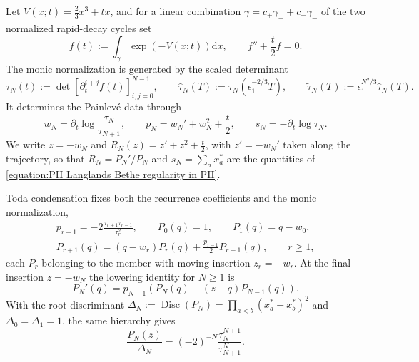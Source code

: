 \documentclass[a4paper,11pt]{article}
\newcommand{\dd}{\mathrm{d}}
\numberwithin{equation}{section}
\begin{document}
Let $V(x;t)=\frac{2}{3}x^{3}+tx$, and for a linear combination
$\gamma=c_{+}\gamma_{+}+c_{-}\gamma_{-}$ of the two normalized
rapid-decay cycles set
\begin{equation}
\label{equation:PII normalization seed}
f(t):=\int_{\gamma}\exp\left(-V(x;t)\right)\dd{x},
\qquad f''+\frac{t}{2}f=0.
\end{equation}
The monic normalization is generated by the scaled determinant
\begin{equation}
\label{equation:PII normalization tau}
\tau_{N}(t):=\det\left[\partial_{t}^{i+j}f(t)\right]_{i,j=0}^{N-1},
\qquad
\widehat{\tau}_{N}(T):=\tau_{N}\left(\epsilon_{1}^{-2/3}T\right),
\qquad
\widetilde{\tau}_{N}(T):=\epsilon_{1}^{N^{2}/3}\widehat{\tau}_{N}(T).
\end{equation}
It determines the Painlev\'e data through
\begin{equation}
\label{equation:PII normalization hierarchy}
w_{N}=\partial_{t}\log{\frac{\tau_{N}}{\tau_{N+1}}},
\qquad
p_{N}=w_{N}'+w_{N}^{2}+\frac{t}{2},
\qquad
s_{N}=-\partial_{t}\log{\tau_{N}}.
\end{equation}
We write $z=-w_{N}$ and $R_{N}(z)=z'+z^{2}+\frac{t}{2}$, with
$z'=-w_{N}'$ taken along the trajectory, so that $R_{N}=P_{N}'/P_{N}$
and $s_{N}=\sum_{a}x_{a}^{*}$ are the quantities of
\eqref{equation:PII Langlands Bethe regularity in PII}.

Toda condensation fixes both the recurrence coefficients and the
monic normalization,
\begin{equation}
\label{equation:PII tau polynomial recursion}
\begin{gathered}
p_{r-1}=-2\frac{\tau_{r+1}\tau_{r-1}}{\tau_{r}^{2}},
\qquad P_{0}(q)=1,\qquad P_{1}(q)=q-w_{0},\\
P_{r+1}(q)=(q-w_{r})P_{r}(q)
+\frac{p_{r-1}}{2}P_{r-1}(q),\qquad r\geq1,
\end{gathered}
\end{equation}
each $P_{r}$ belonging to the member with moving insertion
$z_{r}=-w_{r}$.  At the final insertion $z=-w_{N}$ the lowering
identity for $N\geq1$ is
\begin{equation}
\label{equation:PII tau polynomial lowering}
P_{N}'(q)=p_{N-1}\left(
P_{N}(q)+(z-q)P_{N-1}(q)\right).
\end{equation}
With the root discriminant
$\Delta_{N}:=\operatorname{Disc}{(P_{N})}
=\prod_{a<b}(x_{a}^{*}-x_{b}^{*})^{2}$ and
$\Delta_{0}=\Delta_{1}=1$, the same hierarchy gives
\begin{equation}
\label{equation:PII tau discriminant identity}
\frac{P_{N}(z)}{\Delta_{N}}
=(-2)^{-N}\frac{\tau_{N}^{N+1}}{\tau_{N+1}^{N}}.
\end{equation}
\end{document}
